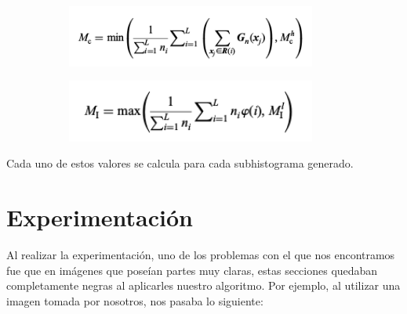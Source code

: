 \documentclass[10pt, a4paper]{article}
\begin{document}
\begin{figure}[H]
	\centering
    \begin{subfigure}{0.5\textwidth}
        \includegraphics[width=0.9\textwidth]{calculo-Mc.png}
    \end{subfigure}\hfill
    \begin{subfigure}{0.5\textwidth}
        \includegraphics[width=0.9\textwidth]{calculo_Mi.png}
    \end{subfigure}\hfill
\end{figure}

Cada uno de estos valores se calcula para cada subhistograma generado.

\section{Experimentación}

Al realizar la experimentación, uno de los problemas con el que nos encontramos fue que en imágenes que poseían partes muy claras, estas secciones quedaban completamente negras al aplicarles nuestro algoritmo.  Por ejemplo, al utilizar una imagen tomada por nosotros, nos pasaba lo siguiente:
\end{document}
